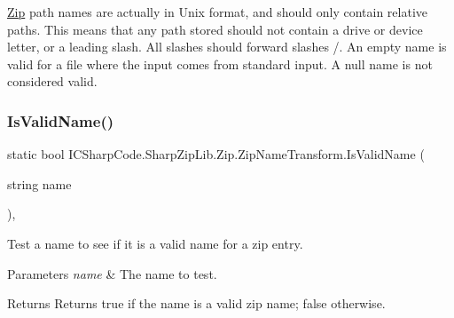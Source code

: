 \hyperlink{namespace_i_c_sharp_code_1_1_sharp_zip_lib_1_1_zip}{Zip} path names are actually in Unix format, and should only contain relative paths. This means that any path stored should not contain a drive or device letter, or a leading slash. All slashes should forward slashes \textquotesingle{}/\textquotesingle{}. An empty name is valid for a file where the input comes from standard input. A null name is not considered valid. \mbox{\label{class_i_c_sharp_code_1_1_sharp_zip_lib_1_1_zip_1_1_zip_name_transform_abff0f26baee3573886aa606a79c31d48}} 
\subsubsection{\texorpdfstring{Is\+Valid\+Name()}{IsValidName()}\hspace{0.1cm}{\footnotesize\ttfamily [2/2]}}
{\footnotesize\ttfamily static bool I\+C\+Sharp\+Code.\+Sharp\+Zip\+Lib.\+Zip.\+Zip\+Name\+Transform.\+Is\+Valid\+Name (\begin{DoxyParamCaption}\item[{string}]{name }\end{DoxyParamCaption})\hspace{0.3cm}{\ttfamily [inline]}, {\ttfamily [static]}}



Test a name to see if it is a valid name for a zip entry. 


\begin{DoxyParams}{Parameters}
{\em name} & The name to test.\\
\hline
\end{DoxyParams}
\begin{DoxyReturn}{Returns}
Returns true if the name is a valid zip name; false otherwise.
\end{DoxyReturn}


